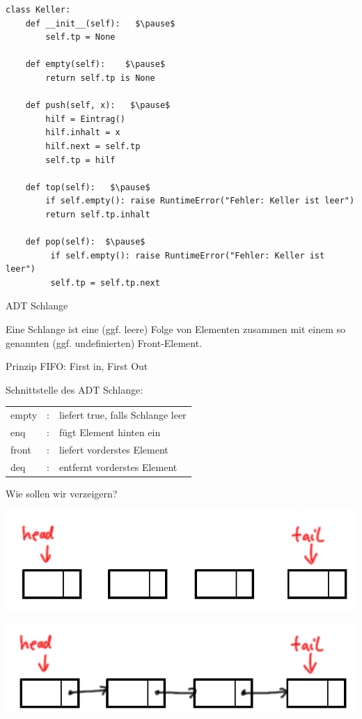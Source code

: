 \documentclass{beamer}
\begin{document}
\begin{frame}[fragile]
\begin{lstlisting}[mathescape=true]
class Keller:
    def __init__(self):   $\pause$
        self.tp = None

    def empty(self):    $\pause$
        return self.tp is None

    def push(self, x):   $\pause$
        hilf = Eintrag()
        hilf.inhalt = x
        hilf.next = self.tp
        self.tp = hilf

    def top(self):   $\pause$
        if self.empty(): raise RuntimeError("Fehler: Keller ist leer")
        return self.tp.inhalt

    def pop(self):  $\pause$
         if self.empty(): raise RuntimeError("Fehler: Keller ist leer")
         self.tp = self.tp.next
\end{lstlisting}
\end{frame}


\begin{frame}[fragile]

ADT Schlange  

Eine Schlange ist eine (ggf. leere) Folge von Elementen zusammen mit einem so genannten
(ggf. undefinierten) Front-Element.  

Prinzip FIFO: First in, First Out  

Schnittstelle des ADT Schlange:

\footnotesize
\begin{tabular}{l l l}
 empty & : & liefert true, falls Schlange leer \\
 enq & : &  fügt Element hinten ein\\
 front & :  & liefert vorderstes Element\\ 
 deq & : &  entfernt vorderstes Element \\
\end{tabular}

\end{frame}


\begin{frame}[fragile]
Wie sollen wir verzeigern?

\includegraphics[scale=0.6]{schlange1.png}  \pause 

\includegraphics[scale=0.6]{schlange2.png}

\end{frame}
\end{document}

